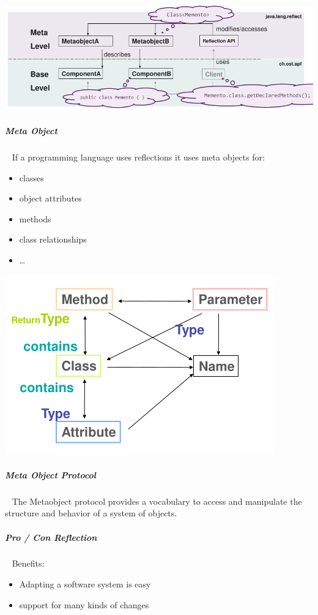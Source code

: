 \documentclass[11pt,twoside,landscape]{article}
\begin{document}
\begin{multicols}{3}
{
\begin{center}
\includegraphics[width=.9\linewidth]{img/meta_base_level.png}
\end{center}
\label{fig:meta-level-and-base-level}
}
\subparagraph{Meta Object} \
\label{sec:orgcca959f}
If a programming language uses reflections it uses meta objects for:
\begin{itemize}
\item classes
\item object attributes
\item methods
\item class relationships
\item \ldots{}
\end{itemize}


{
\begin{center}
\includegraphics[width=.9\linewidth]{img/meta_object_relationships.png}
\end{center}
\label{fig:meta-object-class-relations}
}
\subparagraph{Meta Object Protocol} \
\label{sec:orgf0a56d4}
The Metaobject protocol provides a vocabulary to access and manipulate the structure and behavior of a system of objects.
\subparagraph{Pro / Con Reflection} \
\label{sec:org627e18d}
Benefits:
\begin{itemize}
\item Adapting a software system is easy
\item support for many kinds of changes
\end{itemize}



\end{multicols}
\end{document}
